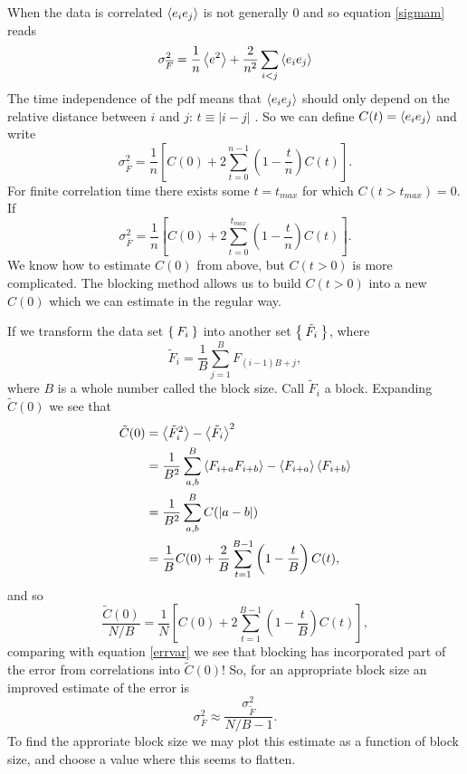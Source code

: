 \documentclass[a4paper,English,10pt]{article}
\newcommand{\be}{\begin{equation}}
\newcommand{\ee}{\end{equation}}
\newcommand{\f}{\frac}
\renewcommand{\bar}{\overline}
\renewcommand{\braket}{\Braket}
\begin{document}
When the data is correlated $\braket{e_ie_j}$ is not generally $0$ and so equation \ref{sigmam} reads
\be
\sigma_{\bar{F}}^2 = \f{1}{n}\braket{e^2} + \f{2}{n^2}\sum_{i<j}\braket{e_ie_j}
\ee
The time independence of the pdf means that $\braket{e_ie_j}$ should only depend on the relative distance between $i$ and $j$:
$t \equiv |i-j|$ \cite{block}. So we can define $C(t) = \braket{e_ie_j}$ and write
\be
\sigma_{\bar{F}}^2 = \f{1}{n}\left[C(0) + 2\sum_{t = 0}^{n-1}\left(1-\f{t}{n}\right)C(t)\right]. 
\ee
For finite correlation time there exists some $t = t_{max}$ for which $C(t>t_{max}) = 0$. If
\be
\sigma_{\bar{F}}^2 = \f{1}{n}\left[C(0) + 2\sum_{t = 0}^{t_{max}}\left(1-\f{t}{n}\right)C(t)\right]. \label{errvar}
\ee
We know how to estimate $C(0)$ from above, but $C(t>0)$ is more complicated.
The blocking method allows us to build $C(t>0)$ into a new $C(0)$ which we can estimate in the regular way.


If we transform the data set $\Set{F_i}$ into another set $\Set{\tilde{F}_i}$, where
\be
\tilde{F}_i = \f{1}{B}\sum_{j=1}^{B}F_{(i-1)B+j},\label{block}
\ee
where $B$ is a whole number called the block size. Call $\tilde{F}_i$ a block.
Expanding $\tilde{C}(0)$ we see that
\begin{align*}
  \tilde{C}(0) &= \braket{\tilde{F}_i^2}-\braket{\tilde{F}_i}^2\\
  &= \f{1}{B^2}\sum_{a,b}^B\braket{F_{i+a}F_{i+b}}-\braket{F_{i+a}}\braket{F_{i+b}}\\
  &= \f{1}{B^2}\sum_{a,b}^BC(|a-b|)\\
  &= \f{1}{B}C(0) + \f{2}{B}\sum_{t=1}^{B-1}\left(1-\f{t}{B}\right)C(t),
\end{align*}
and so
\be
\f{\tilde{C}(0)}{N/B} = \f{1}{N}\left[C(0) +2\sum_{t = 1}^{B-1}\left(1-\f{t}{B}\right)C(t)\right],\label{blockvar}
\ee
comparing with equation \ref{errvar} we see that blocking has incorporated part of the error from correlations into $\tilde{C}(0)$! So, for an appropriate block size an improved estimate of the error is
\be
\sigma_{\bar{F}}^2 \approx \f{\sigma_{\tilde{F}}^2}{N/B -1}.\label{errest}
\ee
To find the approriate block size we may plot this estimate as a function of block size, and choose a value where this seems to flatten. 
\end{document}
